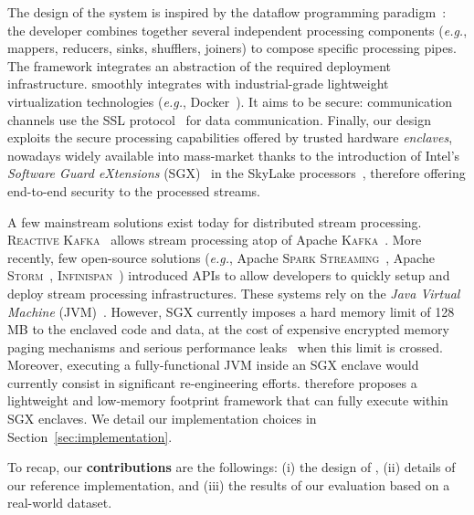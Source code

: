 The design of the system is inspired by the dataflow programming paradigm~\cite{uustalu_essence_2005}: the developer combines together several independent processing components (\emph{e.g.}, mappers, reducers, sinks, shufflers, joiners) to compose specific processing pipes.
The framework integrates an abstraction of the required deployment infrastructure.
\SYS{} smoothly integrates with industrial-grade lightweight virtualization technologies (\emph{e.g.}, Docker~\cite{docker}).
It aims to be secure: communication channels use the SSL protocol~\cite{freier2011secure} for data communication.
Finally, our design exploits the secure processing capabilities offered by trusted hardware \emph{enclaves}, nowadays widely available into mass-market thanks to the introduction of Intel's \emph{Software Guard eXtensions} (SGX)~\cite{costan_intel} in the SkyLake processors~\cite{intel:skylake}, therefore offering end-to-end security to the processed streams.

A few mainstream solutions exist today for distributed stream processing.
\textsc{Reactive Kafka}~\cite{reactivekafka} allows stream processing atop of Apache \textsc{Kafka}~\cite{apachekafka}.
More recently, few open-source solutions (\emph{e.g.}, Apache \textsc{Spark Streaming}~\cite{apachesparkstreaming}, Apache \textsc{Storm}~\cite{apachestorm}, \textsc{Infinispan}~\cite{infinispan}) introduced APIs to allow developers to quickly setup and deploy stream processing infrastructures.
These systems rely on the \emph{Java Virtual Machine} (JVM)~\cite{lindholm2014java}.
However, SGX currently imposes a hard memory limit of 128\,MB to the enclaved code and data, at the cost of expensive encrypted memory paging mechanisms and serious performance leaks~\cite{pires_scbr:2016,brenner_securekeeper:_2016} when this limit is crossed.
Moreover, executing a fully-functional JVM inside an SGX enclave would currently consist in significant re-engineering efforts.
\SYS{} therefore proposes a lightweight and low-memory footprint framework that can fully execute within SGX enclaves.
We detail our implementation choices in Section~\ref{sec:implementation}.

To recap, our \textbf{contributions} are the followings: (i) the design of \SYS{}, (ii) details of our reference implementation, and (iii) the results of our evaluation based on a real-world dataset.

